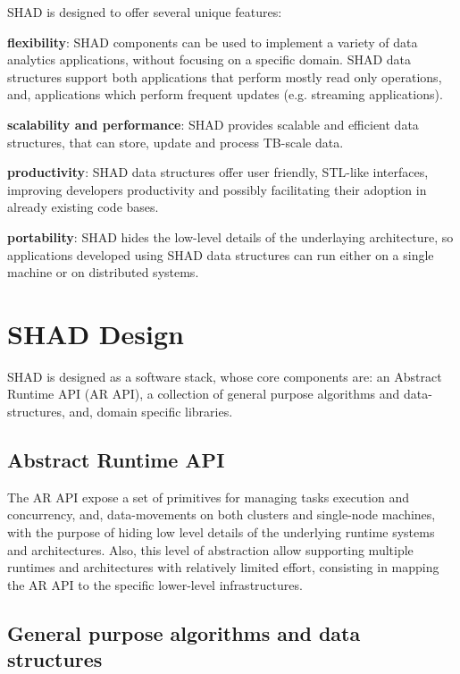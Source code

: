 S\-H\-A\-D is designed to offer several unique features\-: \begin{DoxyItemize}
\item {\bfseries flexibility}\-: S\-H\-A\-D components can be used to implement a variety of data analytics applications, without focusing on a specific domain. S\-H\-A\-D data structures support both applications that perform mostly read only operations, and, applications which perform frequent updates (e.\-g. streaming applications). \item {\bfseries scalability and performance}\-: S\-H\-A\-D provides scalable and efficient data structures, that can store, update and process T\-B-\/scale data. \item {\bfseries productivity}\-: S\-H\-A\-D data structures offer user friendly, S\-T\-L-\/like interfaces, improving developers productivity and possibly facilitating their adoption in already existing code bases. \item {\bfseries portability}\-: S\-H\-A\-D hides the low-\/level details of the underlaying architecture, so applications developed using S\-H\-A\-D data structures can run either on a single machine or on distributed systems.\end{DoxyItemize}
\hypertarget{index_Overview}{}\section{S\-H\-A\-D Design}\label{index_Overview}
S\-H\-A\-D is designed as a software stack, whose core components are\-: an Abstract Runtime A\-P\-I (A\-R A\-P\-I), a collection of general purpose algorithms and data-\/structures, and, domain specific libraries.\hypertarget{index_ARAPI}{}\subsection{Abstract Runtime A\-P\-I}\label{index_ARAPI}
The A\-R A\-P\-I expose a set of primitives for managing tasks execution and concurrency, and, data-\/movements on both clusters and single-\/node machines, with the purpose of hiding low level details of the underlying runtime systems and architectures. Also, this level of abstraction allow supporting multiple runtimes and architectures with relatively limited effort, consisting in mapping the A\-R A\-P\-I to the specific lower-\/level infrastructures.\hypertarget{index_algorithms}{}\subsection{General purpose algorithms and data structures}\label{index_algorithms}
